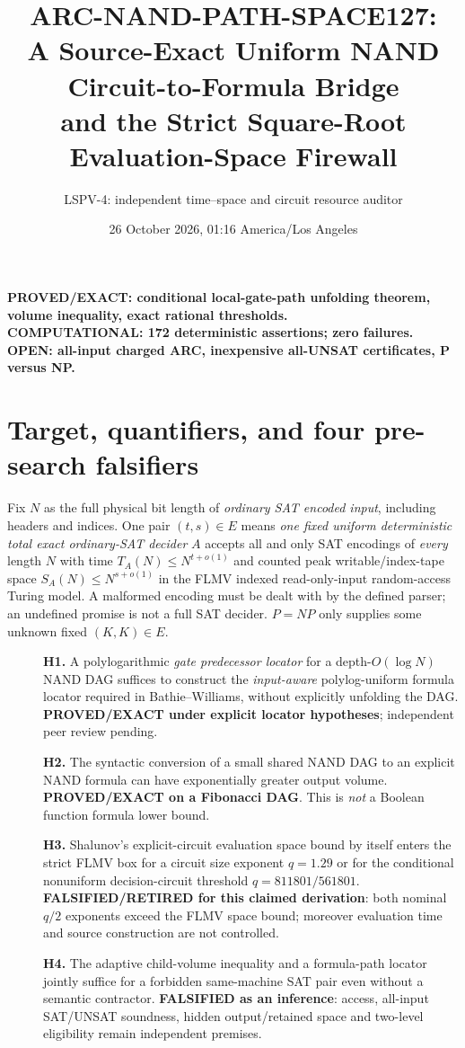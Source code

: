 \documentclass[11pt]{article}
\title{ARC-NAND-PATH-SPACE127:\\ A Source-Exact Uniform NAND Circuit-to-Formula Bridge\\
and the Strict Square-Root Evaluation-Space Firewall}
\author{LSPV-4: independent time--space and circuit resource auditor}
\date{26 October 2026, 01:16 America/Los Angeles}
\begin{document}
\maketitle
\begin{center}
\textbf{PROVED/EXACT: conditional local-gate-path unfolding theorem, volume inequality, exact rational thresholds.}\\
\textbf{COMPUTATIONAL: 172 deterministic assertions; zero failures.}\\
\textbf{OPEN: all-input charged ARC, inexpensive all-UNSAT certificates, P versus NP.}
\end{center}

\section{Target, quantifiers, and four pre-search falsifiers}
Fix $N$ as the full physical bit length of \emph{ordinary SAT encoded input}, including headers and indices. One pair $(t,s)\in E$ means \emph{one fixed uniform deterministic total exact ordinary-SAT decider} $A$ accepts all and only SAT encodings of \emph{every} length $N$ with time $T_A(N)\le N^{t+o(1)}$ and counted peak writable/index-tape space $S_A(N)\le N^{s+o(1)}$ in the FLMV indexed read-only-input random-access Turing model. A malformed encoding must be dealt with by the defined parser; an undefined promise is not a full SAT decider. $P=NP$ only supplies some unknown fixed $(K,K)\in E$.
\begin{description}
\item[] \textbf{H1.} A polylogarithmic \emph{gate predecessor locator} for a depth-$O(\log N)$ NAND DAG suffices to construct the \emph{input-aware} polylog-uniform formula locator required in Bathie--Williams, without explicitly unfolding the DAG. \textbf{PROVED/EXACT under explicit locator hypotheses}; independent peer review pending.
\item[] \textbf{H2.} The syntactic conversion of a small shared NAND DAG to an explicit NAND formula can have exponentially greater output volume. \textbf{PROVED/EXACT on a Fibonacci DAG}. This is \emph{not} a Boolean function formula lower bound.
\item[] \textbf{H3.} Shalunov's explicit-circuit evaluation space bound by itself enters the strict FLMV box for a circuit size exponent $q=1.29$ or for the conditional nonuniform decision-circuit threshold $q=811801/561801$. \textbf{FALSIFIED/RETIRED for this claimed derivation}: both nominal $q/2$ exponents exceed the FLMV space bound; moreover evaluation time and source construction are not controlled.
\item[] \textbf{H4.} The adaptive child-volume inequality and a formula-path locator jointly suffice for a forbidden same-machine SAT pair even without a semantic contractor. \textbf{FALSIFIED as an inference}: access, all-input SAT/UNSAT soundness, hidden output/retained space and two-level eligibility remain independent premises.
\end{description}
\end{document}
